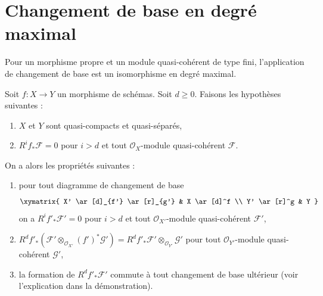 \section{Changement de base en degré maximal}
\label{section-top-degree}

\noindent
Pour un morphisme propre et un module quasi-cohérent de type fini,
l'application de changement de base est un isomorphisme en degré maximal.

\begin{lemma}
\label{lemma-top-cohomology-functor}
Soit $f : X \to Y$ un morphisme de schémas. Soit $d \geq 0$. Faisons les hypothèses suivantes :
\begin{enumerate}
\item $X$ et $Y$ sont quasi-compacts et quasi-séparés,
\item $R^if_*\mathcal{F} = 0$ pour $i > d$ et
tout $\mathcal{O}_X$-module quasi-cohérent $\mathcal{F}$.
\end{enumerate}
On a alors les propriétés suivantes :
\begin{enumerate}
\item[(a)] pour tout diagramme de changement de base
$$
\xymatrix{
X' \ar[d]_{f'} \ar[r]_{g'} & X \ar[d]^f \\
Y' \ar[r]^g & Y
}
$$
on a $R^if'_*\mathcal{F}' = 0$ pour $i > d$ et tout
$\mathcal{O}_{X'}$-module quasi-cohérent $\mathcal{F}'$,
\item[(b)]
$R^df'_*(\mathcal{F}' \otimes_{\mathcal{O}_{X'}} (f')^*\mathcal{G}') =
R^df'_*\mathcal{F}' \otimes_{\mathcal{O}_{Y'}} \mathcal{G}'$
pour tout $\mathcal{O}_{Y'}$-module quasi-cohérent $\mathcal{G}'$,
\item[(c)] la formation de $R^df'_*\mathcal{F}'$ commute à tout
changement de base ultérieur (voir l'explication dans la démonstration).
\end{enumerate}
\end{lemma}

